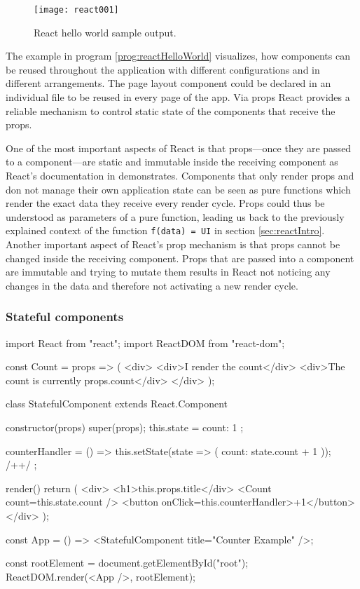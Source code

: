 \begin{figure}
  \centering
  \texttt{[image: react001]}
  \caption{React hello world sample output.}
  \label{fig:reactHelloWorld}
\end{figure}

The example in program \ref{prog:reactHelloWorld} visualizes, how components can be reused throughout the application with different configurations and in different arrangements. The page layout component could be declared in an individual file to be reused in every page of the app. Via props React provides a reliable mechanism to control static state of the components that receive the props.

One of the most important aspects of React is that props---once they are passed to a component---are static and immutable inside the receiving component as React's documentation in \cite[/docs/components-and-props.html\#props-are-read-only]{React} demonstrates. Components that only render props and don not manage their own application state can be seen as pure functions which render the exact data they receive every render cycle. Props could thus be understood as parameters of a pure function, leading us back to the previously explained context of the function \texttt{f(data) = UI} in section \ref{sec:reactIntro}. Another important aspect of React's prop mechanism is that props cannot be changed inside the receiving component. Props that are passed into a component are immutable and trying to mutate them results in React not noticing any changes in the data and therefore not activating a new render cycle.

\subsubsection{Stateful components}

\begin{program}
\caption{Simple example of a React component and its usage.} 
\label{prog:reactStateful}
\begin{JsCode}
import React from "react";
import ReactDOM from "react-dom";

const Count = props => (
  <div>
    <div>I render the count</div>
    <div>The count is currently {props.count}</div>
  </div>
);

class StatefulComponent extends React.Component {
  constructor(props) {
    super(props);
    this.state = {
      count: 1
    };
  }

  counterHandler = () => {
    this.setState(state => ({ count: state.count + 1 })); /+\label{line:setState}+/
  };

  render() {
    return (
      <div>
        <h1>{this.props.title}</div>
        <Count count={this.state.count} />
        <button onClick={this.counterHandler}>+1</button>
      </div>
    );
  }
}

const App = () => <StatefulComponent title={"Counter Example"} />;

const rootElement = document.getElementById("root");
ReactDOM.render(<App />, rootElement);
\end{JsCode}
\end{program}


